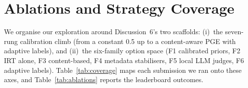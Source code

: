 %
%
\newcommand{\TBD}{\textit{pending}}
\newcommand{\lbNLLsubOne}{-1.01}\newcommand{\lbAUCsubOne}{0.62}
\newcommand{\lbNLLsubTwo}{-0.93}\newcommand{\lbAUCsubTwo}{0.63}
\newcommand{\lbNLLsubThree}{-0.85}\newcommand{\lbAUCsubThree}{0.63}
\newcommand{\lbNLLsubFive}{-0.65}\newcommand{\lbAUCsubFive}{0.63}
\newcommand{\lbNLLsubSix}{-0.65}\newcommand{\lbAUCsubSix}{\TBD}
\newcommand{\lbNLLsubSeven}{-0.65}\newcommand{\lbAUCsubSeven}{\TBD}
\newcommand{\lbNLLsubEight}{-0.75}\newcommand{\lbAUCsubEight}{\TBD}
\newcommand{\lbNLLconstHalf}{\TBD}\newcommand{\lbAUCconstHalf}{\TBD}
\newcommand{\lbNLLconstGM}{\TBD}\newcommand{\lbAUCconstGM}{\TBD}
\newcommand{\lbNLLsubjMean}{\TBD}\newcommand{\lbAUCsubjMean}{\TBD}
\newcommand{\lbNLLbmCond}{\TBD}\newcommand{\lbAUCbmCond}{\TBD}
\newcommand{\lbNLLblendSubj}{\TBD}\newcommand{\lbAUCblendSubj}{\TBD}
\newcommand{\lbNLLlabeledShift}{\TBD}\newcommand{\lbAUClabeledShift}{\TBD}

\section{Ablations and Strategy Coverage}
\label{sec:ablations}

We organise our exploration around Discussion~6's two scaffolds:
(i)~the seven-rung calibration climb (from a constant 0.5 up to a
content-aware PGE with adaptive labels), and
(ii)~the six-family option space
(F1 calibrated priors, F2 IRT alone, F3 content-based, F4 metadata
stabilisers, F5 local LLM judges, F6 adaptive labels).
Table~\ref{tab:coverage} maps each submission we ran onto these axes,
and Table~\ref{tab:ablations} reports the leaderboard outcomes.

